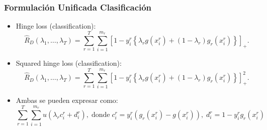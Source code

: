\documentclass[aspectratio=43]{beamer}
\newcommand{\pospart}[1]{\left[#1\right]_{+}}
\newcommand{\ntasks}{T}
\newcommand{\npertask}{m}
\newcommand{\sample}{D}
\newcommand{\risk}{R}
\newcommand{\emprisk}{\hat{\risk}_{\sample}}
\begin{document}
\begin{frame}
      \frametitle{Formulación Unificada Clasificación}

      \begin{itemize}
            \item Hinge loss (classification):
            \begin{equation}
                \nonumber%
                \emprisk(\lambda_1, \ldots, \lambda_\ntasks) = \sum_{r=1}^\ntasks \sum_{i=1}^{\npertask_r} \pospart{1 - y_i^r \left\lbrace\lambda_r g(x_i^r) + (1 - \lambda_r) g_r(x_i^r) \right \rbrace} .
            \end{equation}
            \item Squared hinge loss (classification):
            \begin{equation}
                \nonumber%
                \emprisk(\lambda_1, \ldots, \lambda_\ntasks) = \sum_{r=1}^\ntasks \sum_{i=1}^{\npertask_r} \pospart{1 - y_i^r \left\lbrace\lambda_r g(x_i^r) + (1 - \lambda_r) g_r(x_i^r) \right \rbrace}^2 .
            \end{equation}
            \item Ambas se pueden expresar como:
            \begin{equation}
                  \nonumber
                  \sum_{r=1}^\ntasks \sum_{i=1}^{\npertask_r} u(\lambda_r c_i^r + d_i^r) , \; \text{donde} \; c_i^r =  y_i^r (g_r(x_i^r) - g(x_i^r))  , \;  d_i^r =  1 - y_i^r g_r(x_i^r)
              \end{equation}
        \end{itemize}

\end{frame}
\end{document}
